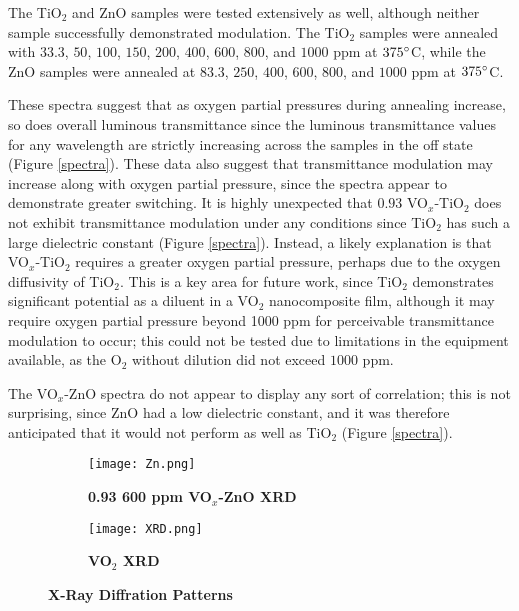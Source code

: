 \documentclass[a4paper]{article}
\begin{document}
The TiO$_2$ and ZnO samples were tested extensively as well, although neither sample successfully demonstrated modulation. The TiO$_2$ samples were annealed with $33.3$, $50$, $100$, $150$, $200$, $400$, $600$, $800$, and $1000$ ppm at $375\degree$C, while the ZnO samples were annealed at $83.3$, $250$, $400$, $600$, $800$, and $1000$ ppm at $375\degree$C. 


These spectra suggest that as oxygen partial pressures during annealing increase, so does overall luminous transmittance since the luminous transmittance values for any wavelength are strictly increasing across the samples in the off state (Figure \ref{spectra}). These data also suggest that transmittance modulation may increase along with oxygen partial pressure, since the spectra appear to demonstrate greater switching. It is highly unexpected that $0.93$ VO$_x$-TiO$_2$ does not exhibit transmittance modulation under any conditions since TiO$_2$ has such a large dielectric constant (Figure \ref{spectra}). Instead, a likely explanation is that VO$_x$-TiO$_2$ requires a greater oxygen partial pressure, perhaps due to the oxygen diffusivity of TiO$_2$. This is a key area for future work, since TiO$_2$ demonstrates significant potential as a diluent in a VO$_2$ nanocomposite film, although it may require oxygen partial pressure beyond 1000 ppm for perceivable transmittance modulation to occur; this could not be tested due to limitations in the equipment available, as the O$_2$ without dilution did not exceed $1000$ ppm. 

The VO$_x$-ZnO spectra do not appear to display any sort of correlation; this is not surprising, since ZnO had a low dielectric constant, and it was therefore anticipated that it would not perform as well as TiO$_2$ (Figure \ref{spectra}). 


\begin{figure*}
\centering
\begin{subfigure}{.5\textwidth}
  \centering
  \texttt{[image: Zn.png]}
  \caption{\textbf{0.93 600 ppm VO$_x$-ZnO XRD }}
  \label{ZnXRD}
\end{subfigure}%
\begin{subfigure}{.5\textwidth}
  \centering
  \texttt{[image: XRD.png]}
  \caption{\textbf{VO$_2$ XRD }}
  \label{VO2XRD}
\end{subfigure}
\caption{\textbf{X-Ray Diffration Patterns}}
\label{XRD}
\end{figure*}
    
\end{document}
